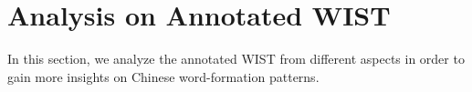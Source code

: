 







\section{Analysis on Annotated WIST} 

In this section, we analyze the annotated WIST from different aspects in order to gain more insights on Chinese word-formation patterns. 


